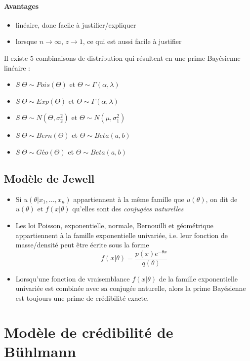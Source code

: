 \documentclass[10pt, french]{article}
\begin{document}
\begin{multicols*}{3}
\paragraph{Avantages}
\begin{itemize}
\item linéaire, donc facile à justifier/expliquer
\item lorsque $n \to \infty$, $z \to 1$, ce qui est aussi facile à justifier
\end{itemize}

Il existe 5 combinaisons de distribution qui résultent en une prime Bayésienne linéaire : 
\begin{itemize}
\item $S | \Theta \sim Pois(\Theta)$ et $\Theta \sim \Gamma(\alpha, \lambda)$
\item $S | \Theta \sim Exp(\Theta)$ et $\Theta \sim \Gamma(\alpha, \lambda)$
\item $S | \Theta \sim N(\Theta, \sigma_2^2)$ et $\Theta \sim N(\mu, \sigma_1^2)$
\item $S | \Theta \sim Bern(\Theta)$ et $\Theta \sim Beta(a,b)$
\item $S | \Theta \sim Géo(\Theta)$ et $\Theta \sim Beta(a,b)$
\end{itemize}

\subsection*{Modèle de Jewell}
\begin{itemize}
\item Si $u(\theta | x_1, ..., x_n)$ appartiennent à la même famille que $u(\theta)$, on dit de $u(\theta)$ et $f(x | \theta)$ qu'elles sont des \emph{conjugées naturelles}
\item Les loi Poisson, exponentielle, normale, Bernouilli et géométrique appartiennent à la famille exponentielle univariée, i.e. leur fonction de masse/densité peut être écrite sous la forme
\[f(x | \theta) =  \frac{p(x) e^{-\theta x}}{q(\theta)}   \]

\item Lorsqu'une fonction de vraisemblance $f(x|\theta)$ de la famille exponentielle univariée est combinée avec sa conjugée naturelle, alors la prime Bayésienne est toujours une prime de crédibilité exacte.
\end{itemize}

\section{Modèle de crédibilité de \\ Bühlmann}

\end{multicols*}
\end{document}
